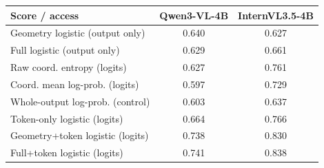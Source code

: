\begin{tabular}{@{}lcc@{}}
\toprule
Score / access & Qwen3-VL-4B & InternVL3.5-4B \\
\midrule
Geometry logistic (output only) & 0.640 & 0.627 \\
Full logistic (output only) & 0.629 & 0.661 \\
\midrule
Raw coord. entropy (logits) & 0.627 & 0.761 \\
Coord. mean log-prob. (logits) & 0.597 & 0.729 \\
Whole-output log-prob. (control) & 0.603 & 0.637 \\
\midrule
Token-only logistic (logits) & 0.664 & 0.766 \\
Geometry+token logistic (logits) & 0.738 & 0.830 \\
Full+token logistic (logits) & 0.741 & 0.838 \\
\bottomrule
\end{tabular}
